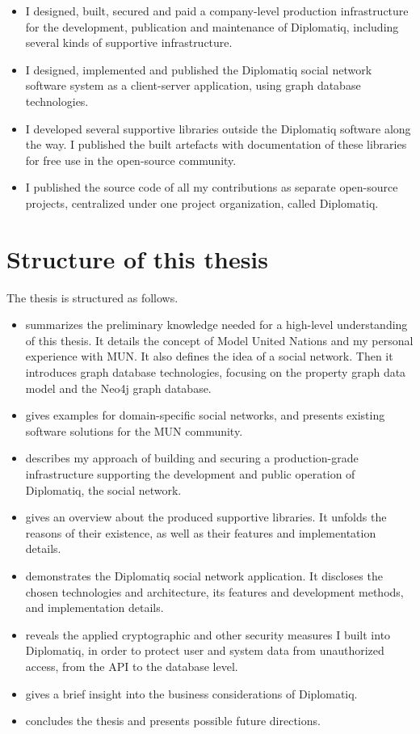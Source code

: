 \begin{itemize}
\item I designed, built, secured and paid a company-level production infrastructure for the development, publication and maintenance of Diplomatiq, including several kinds of supportive infrastructure.
\item I designed, implemented and published the Diplomatiq social network software system as a client-server application, using graph database technologies.
\item I developed several supportive libraries outside the Diplomatiq software along the way. I published the built artefacts with documentation of these libraries for free use in the open-source community.
\item I published the source code of all my contributions as separate open-source projects, centralized under one project organization, called Diplomatiq.
\end{itemize}

\section{Structure of this thesis}

The thesis is structured as follows.

\begin{itemize}
\item \emph{} summarizes the preliminary knowledge needed for a high-level understanding of this thesis. It details the concept of Model United Nations and my personal experience with MUN. It also defines the idea of a social network. Then it introduces graph database technologies, focusing on the property graph data model and the Neo4j graph database.
\item \emph{} gives examples for domain-specific social networks, and presents existing software solutions for the MUN community.
\item \emph{} describes my approach of building and securing a production-grade infrastructure supporting the development and public operation of Diplomatiq, the social network.
\item \emph{} gives an overview about the produced supportive libraries. It unfolds the reasons of their existence, as well as their features and implementation details.
\item \emph{} demonstrates the Diplomatiq social network application. It discloses the chosen technologies and architecture, its features and development methods, and implementation details.
\item \emph{} reveals the applied cryptographic and other security measures I built into Diplomatiq, in order to protect user and system data from unauthorized access, from the API to the database level.
\item \emph{} gives a brief insight into the business considerations of Diplomatiq.
\item \emph{} concludes the thesis and presents possible future directions.
\end{itemize}

